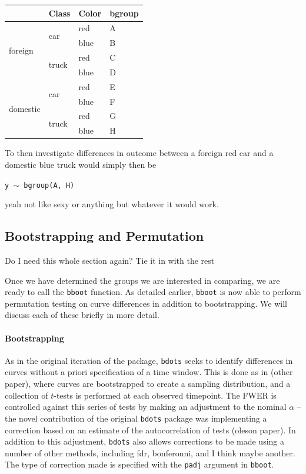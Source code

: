 \documentclass{article}
\newcommand{\xt}{\texttt}%
\begin{document}
\begin{center}

\begin{tabular}{|p{0.9in}|p{0.9in}|p{0.9in}|p{0.5in}|} \hline 
\rowcolor{lightgray} \multicolumn{1}{|c|}{Origin} & \multicolumn{1}{c|}{Class} & \multicolumn{1}{c|}{Color} & \multicolumn{1}{c|}{bgroup}\\
\hline
\multirow{4}{*}{foreign} & \multirow{2}{*}{car} & red & A\\
\hhline{~~--}
& & blue & B \\
\hhline{~---}
& \multirow{2}{*}{truck} & red & C\\
\hhline{~~--}
& & blue & D\\
\hline
\multirow{4}{*}{domestic} & \multirow{2}{*}{car} & red & E \\
\hhline{~~--}
& & blue & F\\
\hhline{~---}
& \multirow{2}{*}{truck} & red & G\\
\hhline{~~--}
& & blue & H\\
\hline
\end{tabular}
\end{center}

To then investigate differences in outcome between a foreign red car and a domestic blue truck would simply then be

\begin{center}
\tt y $\sim$ bgroup(A, H)
\end{center}

yeah not like sexy or anything but whatever it would work.

\subsection{Bootstrapping and Permutation}

Do I need this whole section again? Tie it in with the rest

Once we have determined the groups we are interested in comparing, we are ready to call the \xt{bboot} function. As detailed earlier, \xt{bboot} is now able to perform permutation testing on curve differences in addition to bootstrapping. We will discuss each of these briefly in more detail.

\paragraph{Bootstrapping} As in the original iteration of the package, \xt{bdots} seeks to identify differences in curves without a priori specification of a time window. This is done as in (other paper), where curves are bootstrapped to create a sampling distribution, and a collection of $t$-tests is performed at  each observed timepoint. The FWER is controlled against this series of tests by making an adjustment to the nominal $\alpha$ -- the novel contribution of the original \xt{bdots} package was implementing a correction based on an estimate of the autocorrelation of tests (oleson paper). In addition to this adjustment, \xt{bdots} also allows corrections to be made using a number of other methods, including fdr, bonferonni, and I think maybe another. The type of correction made is specified with the \xt{padj} argument in \xt{bboot}.
\end{document}

